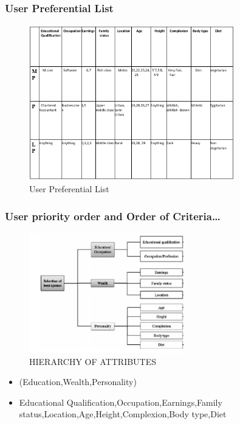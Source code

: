 \documentclass[10pt, compress]{beamer}
\begin{document}
\begin{frame}[fragile]
  \frametitle{User Preferential List}
  \begin{itemize}
      \begin{figure}[h!]
    \centering
    \includegraphics[width=0.8\textwidth]{images/table1.PNG}
    \caption{User Preferential List}
    \label{fig:table1}
\end{figure}
 \end{itemize}
\end{frame}

\begin{frame}[fragile]
  \frametitle{User priority order and Order of Criteria\ldots}
  \begin{figure}[h!]
    \centering
    \includegraphics[width=0.6\textwidth]{images/Capture.png}
    \caption{HIERARCHY OF ATTRIBUTES}
    \label{fig:AHP}
\end{figure}
\begin{itemize}
\item<1>(Education,Wealth,Personality)
 \item<1> Educational Qualification,Occupation,Earnings,Family status,Location,Age,Height,Complexion,Body type,Diet
\end{itemize}
\end{frame}
\end{document}

